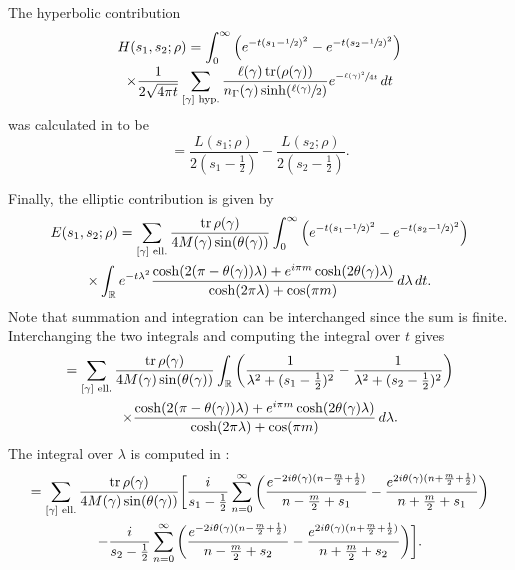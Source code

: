 \documentclass[10pt]{amsart}
\theoremstyle{plain}
\theoremstyle{definition}
\theoremstyle{remark}
\newcommand{\R}{\mathbb{R}}
\DeclareMathOperator{\tr}{tr}
\numberwithin{equation}{section}
\begin{document}
The hyperbolic contribution\vspace*{-3pt}
\begin{multline*}
H(s_1,s_2;\rho) = \int_0^\infty\left(e^{-t(s_1-\sfrac{1}{2})^2}-e^{-t(s_2-\sfrac{1}{2})^2}\right)\\[-3pt]
\times\frac{1}{2\sqrt{4\pi t}}\sum_{[\gamma]\textup{ hyp.}}\frac{\ell(\gamma)\tr(\rho(\gamma))}{n_{\Gamma}(\gamma)\sinh(\sfrac{\ell(\gamma)}{2})}e^{-\sfrac{\ell(\gamma)^2}{4t}}\,dt
\end{multline*}
was calculated in \cite[Prop.\,4.2.4 \& 4.2.5]{FS} to be\vspace*{-3pt}
\[
= \frac{L(s_1;\rho)}{2(s_1-\frac{1}{2})}-\frac{L(s_2;\rho)}{2(s_2-\frac{1}{2})}.
\]

Finally, the elliptic contribution is given by\vspace*{-3pt}
\begin{multline*}
E(s_1,s_2;\rho) = \sum_{[\gamma]\textup{ ell.}} \frac{\tr\rho(\gamma)}{4M(\gamma)\sin(\theta(\gamma))}\int_0^\infty\left(e^{-t(s_1-\sfrac{1}{2})^2}-e^{-t(s_2-\sfrac{1}{2})^2}\right)\\
\times\int_\R e^{-t\lambda^2}\frac{\cosh(2(\pi-\theta(\gamma))\lambda)+e^{i\pi m}\cosh(2\theta(\gamma)\lambda)}{\cosh(2\pi\lambda)+\cos(\pi m)}\,d\lambda\,dt.
\end{multline*}
Note that summation and integration can be interchanged since the sum is finite. Interchanging the two integrals and computing the integral over $t$ gives\vspace*{-3pt}
\begin{multline*}
= \sum_{[\gamma]\textup{ ell.}} \frac{\tr\rho(\gamma)}{4M(\gamma)\sin(\theta(\gamma))}\int_\R\left(\frac{1}{\lambda^2+(s_1-\frac{1}{2})^2}-\frac{1}{\lambda^2+(s_2-\frac{1}{2})^2}\right)\\
\times\frac{\cosh(2(\pi-\theta(\gamma))\lambda)+e^{i\pi m}\cosh(2\theta(\gamma)\lambda)}{\cosh(2\pi\lambda)+\cos(\pi m)}\,d\lambda.
\end{multline*}
The integral over $\lambda$ is computed in \cite[Ch.\,10, Lem.\,2.7]{He2}:\vspace*{-3pt}
\begin{multline}
= \sum_{[\gamma]\textup{ ell.}} \frac{\tr\rho(\gamma)}{4M(\gamma)\sin(\theta(\gamma))}\bigg[\frac{i}{s_1-\frac{1}{2}}\sum_{n=0}^\infty\bigg(\frac{e^{-2i\theta(\gamma)(n-\frac{m}{2}+\frac{1}{2})}}{n-\frac{m}{2}+s_1}-\frac{e^{2i\theta(\gamma)(n+\frac{m}{2}+\frac{1}{2})}}{n+\frac{m}{2}+s_1}\bigg)\\
-\frac{i}{s_2-\frac{1}{2}}\sum_{n=0}^\infty\bigg(\frac{e^{-2i\theta(\gamma)(n-\frac{m}{2}+\frac{1}{2})}}{n-\frac{m}{2}+s_2}-\frac{e^{2i\theta(\gamma)(n+\frac{m}{2}+\frac{1}{2})}}{n+\frac{m}{2}+s_2}\bigg)\bigg].\label{eq:EllipticFinal}
\end{multline}
\end{document}
